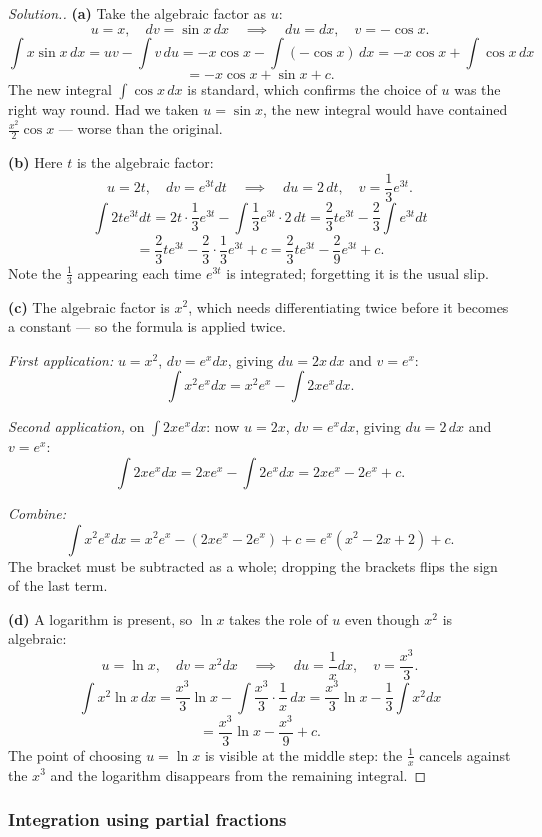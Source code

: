 \documentclass[11pt,a4paper]{article}
\theoremstyle{definition}
\newenvironment{solution}
  {\renewcommand{\qedsymbol}{}\begin{proof}[\textit{Solution}.]}
  {\end{proof}}
\begin{document}
\begin{solution}
\textbf{(a)} Take the algebraic factor as $u$:
$$u=x,\quad dv=\sin x\,dx\quad\implies\quad du=dx,\quad v=-\cos x.$$
$$\int x\sin x\,dx=uv-\int v\,du=-x\cos x-\int(-\cos x)\,dx=-x\cos x+\int\cos x\,dx$$
$$=-x\cos x+\sin x+c.$$
The new integral $\int\cos x\,dx$ is standard, which confirms the choice of $u$ was the
right way round. Had we taken $u=\sin x$, the new integral would have contained
$\frac{x^2}{2}\cos x$ --- worse than the original.

\textbf{(b)} Here $t$ is the algebraic factor:
$$u=2t,\quad dv=e^{3t}dt\quad\implies\quad du=2\,dt,\quad v=\frac{1}{3}e^{3t}.$$
$$\int 2te^{3t}dt=2t\cdot\frac{1}{3}e^{3t}-\int\frac{1}{3}e^{3t}\cdot 2\,dt
=\frac{2}{3}te^{3t}-\frac{2}{3}\int e^{3t}dt$$
$$=\frac{2}{3}te^{3t}-\frac{2}{3}\cdot\frac{1}{3}e^{3t}+c
=\frac{2}{3}te^{3t}-\frac{2}{9}e^{3t}+c.$$
Note the $\frac{1}{3}$ appearing each time $e^{3t}$ is integrated; forgetting it is the
usual slip.

\textbf{(c)} The algebraic factor is $x^2$, which needs differentiating twice before it
becomes a constant --- so the formula is applied twice.

\emph{First application:} $u=x^2$, $dv=e^x dx$, giving $du=2x\,dx$ and $v=e^x$:
$$\int x^2e^xdx=x^2e^x-\int 2xe^xdx.$$

\emph{Second application,} on $\int 2xe^xdx$: now $u=2x$, $dv=e^xdx$, giving $du=2\,dx$
and $v=e^x$:
$$\int 2xe^xdx=2xe^x-\int 2e^xdx=2xe^x-2e^x+c.$$

\emph{Combine:}
$$\int x^2e^xdx=x^2e^x-\left(2xe^x-2e^x\right)+c=e^x\left(x^2-2x+2\right)+c.$$
The bracket must be subtracted as a whole; dropping the brackets flips the sign of the
last term.

\textbf{(d)} A logarithm is present, so $\ln x$ takes the role of $u$ even though $x^2$
is algebraic:
$$u=\ln x,\quad dv=x^2dx\quad\implies\quad du=\frac{1}{x}dx,\quad v=\frac{x^3}{3}.$$
$$\int x^2\ln x\,dx=\frac{x^3}{3}\ln x-\int\frac{x^3}{3}\cdot\frac{1}{x}\,dx
=\frac{x^3}{3}\ln x-\frac{1}{3}\int x^2dx$$
$$=\frac{x^3}{3}\ln x-\frac{x^3}{9}+c.$$
The point of choosing $u=\ln x$ is visible at the middle step: the $\frac{1}{x}$ cancels
against the $x^3$ and the logarithm disappears from the remaining integral.
\end{solution}

\subsubsection{Integration using partial fractions}
\end{document}
